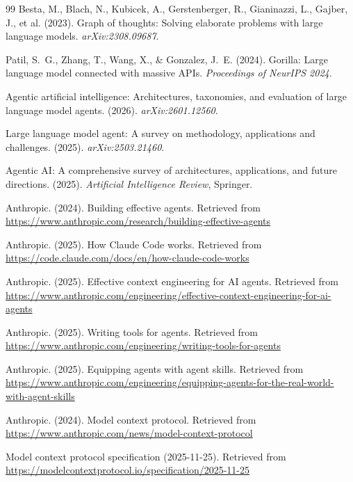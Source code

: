 \documentclass[12pt,a4paper]{report}
\begin{document}
\begin{thebibliography}{99}
Besta, M., Blach, N., Kubicek, A., Gerstenberger, R., Gianinazzi, L., Gajber, J., et al. (2023). Graph of thoughts: Solving elaborate problems with large language models. \textit{arXiv:2308.09687}.

Patil, S.~G., Zhang, T., Wang, X., \& Gonzalez, J.~E. (2024). Gorilla: Large language model connected with massive APIs. \textit{Proceedings of NeurIPS 2024}.

Agentic artificial intelligence: Architectures, taxonomies, and evaluation of large language model agents. (2026). \textit{arXiv:2601.12560}.

Large language model agent: A survey on methodology, applications and challenges. (2025). \textit{arXiv:2503.21460}.

Agentic AI: A comprehensive survey of architectures, applications, and future directions. (2025). \textit{Artificial Intelligence Review}, Springer.

Anthropic. (2024). Building effective agents. Retrieved from \url{https://www.anthropic.com/research/building-effective-agents}

Anthropic. (2025). How Claude Code works. Retrieved from \url{https://code.claude.com/docs/en/how-claude-code-works}

Anthropic. (2025). Effective context engineering for AI agents. Retrieved from \url{https://www.anthropic.com/engineering/effective-context-engineering-for-ai-agents}

Anthropic. (2025). Writing tools for agents. Retrieved from \url{https://www.anthropic.com/engineering/writing-tools-for-agents}

Anthropic. (2025). Equipping agents with agent skills. Retrieved from \url{https://www.anthropic.com/engineering/equipping-agents-for-the-real-world-with-agent-skills}

Anthropic. (2024). Model context protocol. Retrieved from \url{https://www.anthropic.com/news/model-context-protocol}

Model context protocol specification (2025-11-25). Retrieved from \url{https://modelcontextprotocol.io/specification/2025-11-25}


\end{thebibliography}
\end{document}
